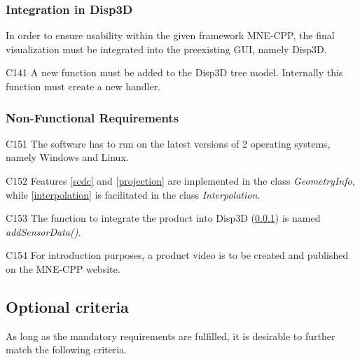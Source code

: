\subsubsection{Integration in Disp3D} \label{integration}
	
	In order to ensure usability within the given framework MNE-CPP, the final visualization must be integrated into the 			preexisting GUI, namely Disp3D.
	
	\begin{aims}
		
		\item[C141] A new function must be added to the Disp3D tree model. Internally this function must create a new 								handler. 
		
	\end{aims}
	
\subsubsection{Non-Functional Requirements}		
	
	
	\begin{aims}

		\item[C151] The software has to run on the latest versions of 2 operating systems, namely Windows and Linux. 
		\item[C152] Features \ref{scdc} and \ref{projection} are implemented in the class \textit{GeometryInfo}, while 								\ref{interpolation} is facilitated in the class \textit{Interpolation}.
		\item[C153] The function to integrate the product into Disp3D (\ref{integration}) is named \textit{addSensorData()}.
		\item[C154] For introduction purposes, a product video is to be created and published on the MNE-CPP website.  
	\end{aims}
	
\newpage	
	
\subsection{Optional criteria}
	
	As long as the mandatory requirements are fulfilled, it is desirable to further match the following criteria. 	
	
